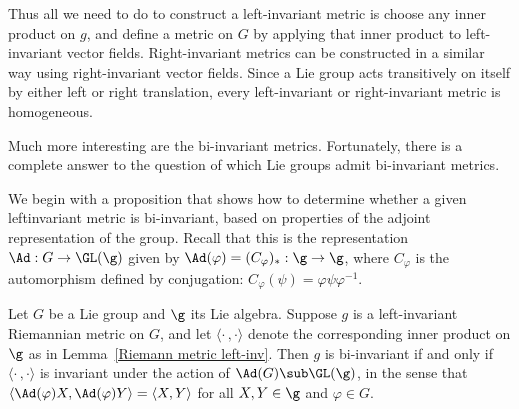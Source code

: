 Thus all we need to do to construct a left-invariant metric is choose any inner product on 
$g$, and define a metric on $G$ by applying that inner product to left-invariant vector 
fields. Right-invariant metrics can be constructed in a similar way using right-invariant 
vector fields. Since a Lie group acts transitively on itself by either left or right 
translation, every left-invariant or right-invariant metric is homogeneous.\par
Much more interesting are the bi-invariant metrics. Fortunately, there is a complete answer 
to the question of which Lie groups admit bi-invariant metrics.\par
We begin with a proposition that shows how to determine whether a given leftinvariant 
metric is bi-invariant, based on properties of the adjoint representation of the group. 
Recall that this is the representation $\Ad:G\to\GL(\g)$ given by 
$\Ad(\varphi)=(C_{\varphi})_*:\g\to\g$, where $C_\varphi$ is the automorphism defined by 
conjugation: $C_{\varphi}(\psi)=\varphi\psi\varphi^{-1}$.
\begin{proposition}\label{Riemann metric bi-inv iff}
Let $G$ be a Lie group and $\g$ its Lie algebra. Suppose $g$ is a left-invariant Riemannian 
metric on $G$, and let $\langle\cdot\,,\cdot\rangle$ denote the corresponding inner product 
on $\g$ as in Lemma~\ref{Riemann metric left-inv}. Then $g$ is bi-invariant if and only if 
$\langle\cdot\,,\cdot\rangle$ is invariant under the action of $\Ad(G)\sub\GL(\g)$, in the 
sense that $\langle\Ad(\varphi)X,\Ad(\varphi)Y\rangle=\langle X,Y\rangle$ for all $X,Y\in\g$ 
and $\varphi\in G$.
\end{proposition}
